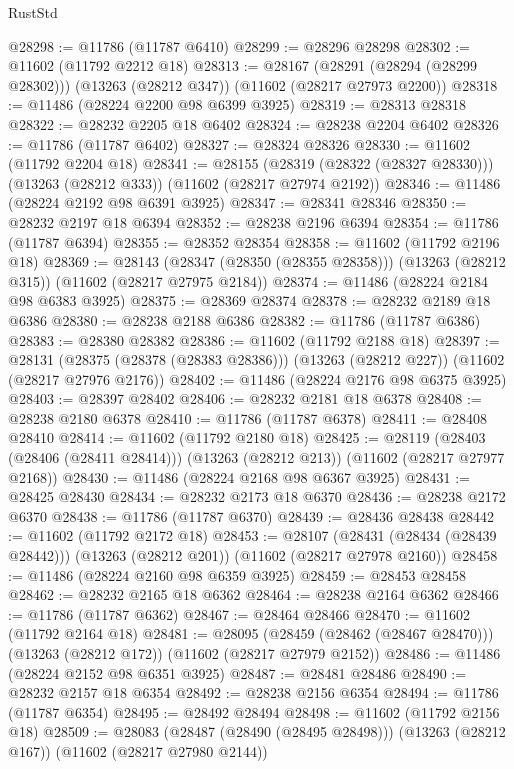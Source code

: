 \begin{lexlean}{RustStd}
\begin{coremodule}
@28298 := @11786 (@11787 @6410)
@28299 := @28296 @28298
@28302 := @11602 (@11792 @2212 @18)
@28313 := @28167
    (@28291 (@28294 (@28299 @28302)))
    (@13263 (@28212 @347))
    (@11602 (@28217 @27973 @2200))
@28318 := @11486 (@28224 @2200 @98 @6399 @3925)
@28319 := @28313 @28318
@28322 := @28232 @2205 @18 @6402
@28324 := @28238 @2204 @6402
@28326 := @11786 (@11787 @6402)
@28327 := @28324 @28326
@28330 := @11602 (@11792 @2204 @18)
@28341 := @28155
    (@28319 (@28322 (@28327 @28330)))
    (@13263 (@28212 @333))
    (@11602 (@28217 @27974 @2192))
@28346 := @11486 (@28224 @2192 @98 @6391 @3925)
@28347 := @28341 @28346
@28350 := @28232 @2197 @18 @6394
@28352 := @28238 @2196 @6394
@28354 := @11786 (@11787 @6394)
@28355 := @28352 @28354
@28358 := @11602 (@11792 @2196 @18)
@28369 := @28143
    (@28347 (@28350 (@28355 @28358)))
    (@13263 (@28212 @315))
    (@11602 (@28217 @27975 @2184))
@28374 := @11486 (@28224 @2184 @98 @6383 @3925)
@28375 := @28369 @28374
@28378 := @28232 @2189 @18 @6386
@28380 := @28238 @2188 @6386
@28382 := @11786 (@11787 @6386)
@28383 := @28380 @28382
@28386 := @11602 (@11792 @2188 @18)
@28397 := @28131
    (@28375 (@28378 (@28383 @28386)))
    (@13263 (@28212 @227))
    (@11602 (@28217 @27976 @2176))
@28402 := @11486 (@28224 @2176 @98 @6375 @3925)
@28403 := @28397 @28402
@28406 := @28232 @2181 @18 @6378
@28408 := @28238 @2180 @6378
@28410 := @11786 (@11787 @6378)
@28411 := @28408 @28410
@28414 := @11602 (@11792 @2180 @18)
@28425 := @28119
    (@28403 (@28406 (@28411 @28414)))
    (@13263 (@28212 @213))
    (@11602 (@28217 @27977 @2168))
@28430 := @11486 (@28224 @2168 @98 @6367 @3925)
@28431 := @28425 @28430
@28434 := @28232 @2173 @18 @6370
@28436 := @28238 @2172 @6370
@28438 := @11786 (@11787 @6370)
@28439 := @28436 @28438
@28442 := @11602 (@11792 @2172 @18)
@28453 := @28107
    (@28431 (@28434 (@28439 @28442)))
    (@13263 (@28212 @201))
    (@11602 (@28217 @27978 @2160))
@28458 := @11486 (@28224 @2160 @98 @6359 @3925)
@28459 := @28453 @28458
@28462 := @28232 @2165 @18 @6362
@28464 := @28238 @2164 @6362
@28466 := @11786 (@11787 @6362)
@28467 := @28464 @28466
@28470 := @11602 (@11792 @2164 @18)
@28481 := @28095
    (@28459 (@28462 (@28467 @28470)))
    (@13263 (@28212 @172))
    (@11602 (@28217 @27979 @2152))
@28486 := @11486 (@28224 @2152 @98 @6351 @3925)
@28487 := @28481 @28486
@28490 := @28232 @2157 @18 @6354
@28492 := @28238 @2156 @6354
@28494 := @11786 (@11787 @6354)
@28495 := @28492 @28494
@28498 := @11602 (@11792 @2156 @18)
@28509 := @28083
    (@28487 (@28490 (@28495 @28498)))
    (@13263 (@28212 @167))
    (@11602 (@28217 @27980 @2144))

\end{coremodule}
\end{lexlean}
